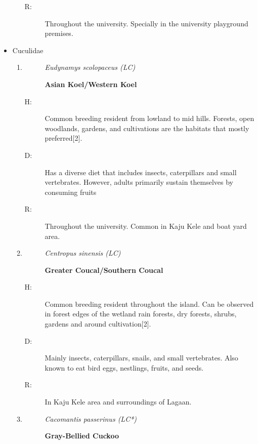 \begin{itemize}
\begin{enumerate}
\begin{description}
\item[R: ]%
Throughout the university. Specially in the university playground premises. %
\end{description}%
\end{enumerate}%
\item%
Cuculidae%
\begin{enumerate}%
\item%
\begin{description}%
\item[]%
\textit{Eudynamys scolopaceus (LC)}%
\item[]%
\textbf{Asian Koel/Western Koel}%
\end{description}%
\begin{description}%
\item[H: ]%
Common breeding resident from lowland to mid hills. Forests, open woodlands, gardens, and cultivations are the habitats that mostly preferred{[}2{]}.%
\item[D: ]%
Has a diverse diet that includes insects, caterpillars and small vertebrates. However, adults primarily sustain themselves by consuming fruits%
\item[R: ]%
Throughout the university. Common in Kaju Kele and boat yard area.%
\end{description}%
\item%
\begin{description}%
\item[]%
\textit{Centropus sinensis (LC)}%
\item[]%
\textbf{Greater Coucal/Southern Coucal}%
\end{description}%
\begin{description}%
\item[H: ]%
Common breeding resident throughout the island. Can be observed in forest edges of the wetland rain forests, dry forests, shrubs, gardens and around cultivation{[}2{]}.%
\item[D: ]%
Mainly insects, caterpillars, snails, and small vertebrates. Also known to eat bird eggs, nestlings, fruits, and seeds.%
\item[R: ]%
In Kaju Kele area and surroundings of Lagaan.%
\end{description}%
\item%
\begin{description}%
\item[]%
\textit{Cacomantis passerinus (LC*)}%
\item[]%
\textbf{Gray{-}Bellied Cuckoo}%
\end{description}%

\end{enumerate}
\end{itemize}
